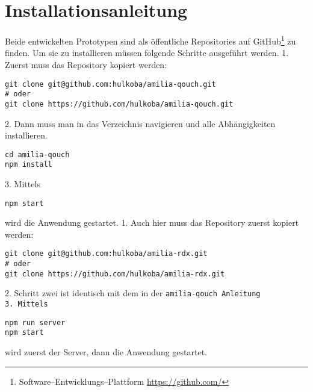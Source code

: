 \section{Installationsanleitung}
Beide entwickelten Prototypen sind als öffentliche Repositories auf GitHub\footnote{Software--Entwicklungs--Plattform \url{https://github.com/}} zu finden. 
Um sie zu installieren müssen folgende Schritte ausgeführt werden.
1. Zuerst muss das Repository kopiert werden:
\begin{lstlisting}
git clone git@github.com:hulkoba/amilia-qouch.git
# oder
git clone https://github.com/hulkoba/amilia-qouch.git
\end{lstlisting}
2. Dann muss man in das Verzeichnis navigieren und alle Abhängigkeiten installieren.
\begin{lstlisting}
cd amilia-qouch
npm install
\end{lstlisting}
3. Mittels
\begin{lstlisting}
npm start
\end{lstlisting}
wird die Anwendung gestartet.
%
1. Auch hier muss das Repository zuerst kopiert werden:
\begin{lstlisting}
git clone git@github.com:hulkoba/amilia-rdx.git
# oder
git clone https://github.com/hulkoba/amilia-rdx.git
\end{lstlisting}
2. Schritt zwei ist identisch mit dem in der \tt{amilia-qouch} Anleitung\\
3. Mittels
\begin{lstlisting}
npm run server
npm start
\end{lstlisting}
wird zuerst der Server, dann die Anwendung gestartet.
%
%

